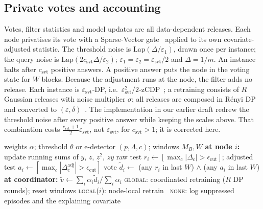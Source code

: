 \IfFileExists{IEEEtran.cls}{\documentclass[journal]{IEEEtran}\newcommand{\ieeemode}{}}{\documentclass[10pt,twocolumn,letterpaper]{article}\usepackage[margin=0.72in,columnsep=0.22in]{geometry}}
\begin{document}
\subsection{Private votes and accounting}
Votes, filter statistics and model updates are all data-dependent releases. Each node privatises its vote with a Sparse-Vector gate~\cite{lyu2017svt} applied to its own covariate-adjusted statistic. The threshold noise is $\mathrm{Lap}(\Delta/\varepsilon_1)$, drawn once per instance; the query noise is $\mathrm{Lap}(2c_{\text{svt}}\Delta/\varepsilon_2)$; $\varepsilon_1=\varepsilon_2=\varepsilon_{\text{svt}}/2$ and $\Delta=1/m$. An instance halts after $c_{\text{svt}}$ positive answers. A positive answer puts the node in the voting state for $W$ blocks. Because the adjustment runs at the node, the filter adds no release. Each instance is $\varepsilon_{\text{svt}}$-DP, i.e.\ $\varepsilon_{\text{svt}}^2/2$-zCDP~\cite{bun2016zcdp}; a retraining consists of $R$ Gaussian releases with noise multiplier $\sigma$; all releases are composed in Rényi DP~\cite{mironov2017renyi} and converted to $(\varepsilon,\delta)$~\cite{canonne2020discrete}. The implementation in our earlier draft redrew the threshold noise after every positive answer while keeping the scales above. That combination costs $\frac{c_{\text{svt}}+1}{2}\varepsilon_{\text{svt}}$, not $\varepsilon_{\text{svt}}$, for $c_{\text{svt}}>1$; it is corrected here.

\begin{algorithm}[t]\small
\caption{Common-cause-aware FDC (one decision step)}\label{alg:fdc}
\begin{algorithmic}[1]
\Require weights $\alpha$; threshold $\theta$ or e-detector $(p,\Lambda,c)$; windows $M_B,W$
\State \textbf{at node $i$:} update running sums of $y$, $z$, $z^2$, $zy$
\State raw test $r_i\gets[\max_c|\Delta_c|>\epsilon_{\text{cut}}]$; adjusted test $a_i\gets[\max_c|\Delta^{\text{adj}}_c|>\epsilon_{\text{cut}}]$
\State vote $\tilde d_i\gets$ (any $r_i$ in last $W$) $\wedge$ (any $a_i$ in last $W$) 
\State \textbf{at coordinator:} $\tilde v\gets\sum_i\alpha_i\tilde d_i/\sum_i\alpha_i$
 \textsc{global}: coordinated retraining ($R$ DP rounds); reset windows
 \textsc{local}($i$): node-local retrain
\Else\ \textsc{none}: log suppressed episodes and the explaining covariate
\EndIf
\end{algorithmic}
\end{algorithm}
\end{document}
